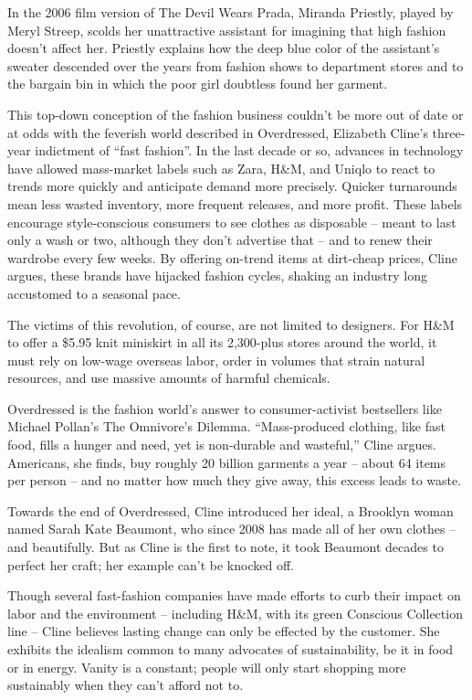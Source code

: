 In the 2006 film version of The Devil Wears Prada, Miranda Priestly, played by Meryl Streep, scolds her unattractive assistant for imagining that high fashion doesn't affect her. Priestly explains how the deep blue color of the assistant's sweater descended over the years from fashion shows to department stores and to the bargain bin in which the poor girl doubtless found her garment.


This top-down conception of the fashion business couldn't be more out of date or at odds with the feverish world described in Overdressed, Elizabeth Cline's three-year indictment of ``fast fashion''. In the last decade or so, advances in technology have allowed mass-market labels such as Zara, H\&M, and Uniqlo to react to trends more quickly and anticipate demand more precisely. Quicker turnarounds mean less wasted inventory, more frequent releases, and more profit. These labels encourage style-conscious consumers to see clothes as disposable – meant to last only a wash or two, although they don't advertise that – and to renew their wardrobe every few weeks. By offering on-trend items at dirt-cheap prices, Cline argues, these brands have hijacked fashion cycles, shaking an industry long accustomed to a seasonal pace.


The victims of this revolution, of course, are not limited to designers. For H\&M to offer a \$5.95 knit miniskirt in all its 2,300-plus stores around the world, it must rely on low-wage overseas labor, order in volumes that strain natural resources, and use massive amounts of harmful chemicals.


Overdressed is the fashion world's answer to consumer-activist bestsellers like Michael Pollan's The Omnivore's Dilemma. ``Mass-produced clothing, like fast food, fills a hunger and need, yet is non-durable and wasteful,'' Cline argues. Americans, she finds, buy roughly 20 billion garments a year – about 64 items per person – and no matter how much they give away, this excess leads to waste.


Towards the end of Overdressed, Cline introduced her ideal, a Brooklyn woman named Sarah Kate Beaumont, who since 2008 has made all of her own clothes – and beautifully. But as Cline is the first to note, it took Beaumont decades to perfect her craft; her example can't be knocked off.


Though several fast-fashion companies have made efforts to curb their impact on labor and the environment – including H\&M, with its green Conscious Collection line – Cline believes lasting change can only be effected by the customer. She exhibits the idealism common to many advocates of sustainability, be it in food or in energy. Vanity is a constant; people will only start shopping more sustainably when they can't afford not to.